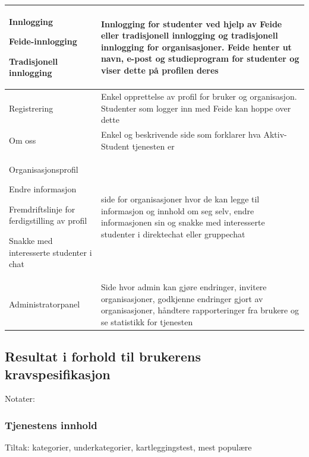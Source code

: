 \begin{center}
\begin{longtabu}{|X|X|}
Innlogging
\begin{compactitem}
    \item Feide-innlogging
    \item Tradisjonell innlogging
\end{compactitem}
& Innlogging for studenter ved hjelp av Feide eller tradisjonell innlogging og tradisjonell innlogging for organisasjoner. Feide henter ut navn, e-post og studieprogram for studenter og viser dette på profilen deres \\ \hline

Registrering 
& Enkel opprettelse av profil for bruker og organisasjon. Studenter som logger inn med Feide kan hoppe over dette \\ \hline

Om oss 
& Enkel og beskrivende side som forklarer hva Aktiv-Student tjenesten er  \\ \hline

Organisasjonsprofil 
\begin{compactitem}
    \item Endre informasjon
    \item Fremdriftslinje for ferdigstilling av profil
    \item Snakke med interesserte studenter i chat
\end{compactitem}
& side for organisasjoner hvor de kan legge til informasjon og innhold om seg selv, endre informasjonen sin og snakke med interesserte studenter i direktechat eller gruppechat  \\ \hline

Administratorpanel 
& Side hvor admin kan gjøre endringer, invitere organisasjoner, godkjenne endringer gjort av organisasjoner, håndtere rapporteringer fra brukere og se statistikk for tjenesten \\ \hline



\end{longtabu}
\end{center}

\subsection{Resultat i forhold til brukerens kravspesifikasjon}
Notater:
\subsubsection{Tjenestens innhold}
Tiltak: kategorier, underkategorier, kartleggingstest, mest populære

